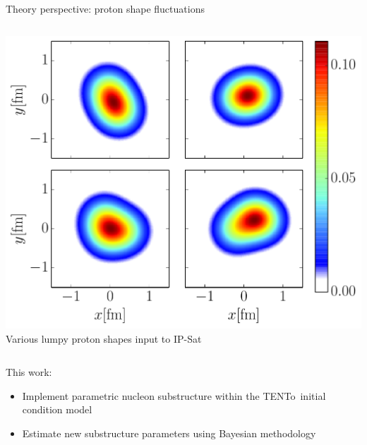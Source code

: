 \documentclass{beamer}
\newcommand{\trento}{T\raisebox{-0.3ex}{R}ENTo}
\begin{document}
\begin{frame}{Theory perspective: proton shape fluctuations}
\begin{columns}
\begin{column}{.4\textwidth}
      \includegraphics[width=.9\columnwidth]{density_smooth}\\
      {\tiny Various lumpy proton shapes input to IP-Sat}
    \end{column}
  \end{columns}

\end{frame}

\begin{frame}
  \begin{columns}
    \begin{column}{.9\textwidth}
    \centering
    {\Large \color{theme} \rm This work:}\\
    \begin{itemize}
      \large
      \item Implement parametric nucleon substructure within the \trento\ initial condition model
      \item Estimate new substructure parameters using Bayesian methodology 
    \end{itemize}
    \end{column}
  \end{columns}
\end{frame}
\end{document}
